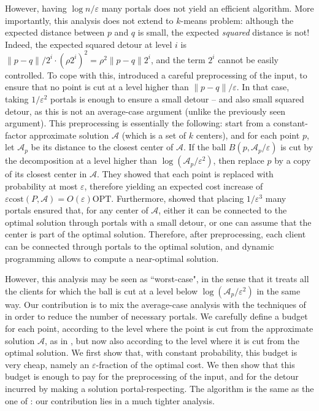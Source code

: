 \documentclass[11pt]{article}
\newcommand{\opt}{\text{OPT}}
\newcommand{\eps}{\varepsilon}
\newcommand{\cost}{\mathrm{cost}}
\newcommand{\calA}{\mathcal A}
\begin{document}
However, having $\log n / \eps$ many portals does not yield an efficient algorithm. 
More importantly, this analysis does not extend to $k$-means problem: although the expected distance between $p$ and $q$ is small, the expected \emph{squared} distance is not! Indeed, the expected squared detour at level $i$ is $\|p-q\| / 2^i \cdot (\rho 2^{i})^2 = \rho^2 \|p-q\| 2^i$, and the term $2^i$ cannot be easily controlled.
To cope with this, \cite{jacm} introduced a careful preprocessing of the input, to ensure that no point is cut at a level higher than $\|p-q\|/\eps$. In that case, taking $1/\eps^2$ portals is enough to ensure a small detour -- and also small squared detour, as this is not an average-case argument (unlike the previously seen argument). This preprocessing is essentially the following: start from a constant-factor approximate solution $\calA$ (which is a set of $k$ centers), and for each point $p$, let $\calA_p$ be its distance to the closest center of $\calA$. 
If the ball $B(p, \calA_p/\eps)$ is cut by the decomposition at a level higher than $\log(\calA_p/\eps^2)$, then replace $p$ by a copy of its closest center in $\calA$. They showed that each point is replaced with probability at most $\eps$, therefore yielding an expected cost increase of $\eps \cost(P, \calA) = O(\eps)\opt$. 
Furthermore, \cite{jacm} showed that placing $1/\eps^3$ many portals ensured that,  for any center of $\calA$, either it can be connected to the optimal solution through portals with a small detour, or one can assume that the center is part of the optimal solution. Therefore, after preprocessing, each client can be connected through portals to the optimal solution, and dynamic programming allows to compute a near-optimal solution.

However, this analysis may be seen as ``worst-case", in the sense that it treats  all the clients for which the ball is cut at a level below $\log(\calA_p/\eps^2)$ in the same way. 
Our contribution is to mix the average-case analysis with the techniques of \cite{jacm} in order to reduce the number of necessary portals. 
We carefully define a budget for each point, according to the level where the point is cut from the approximate solution $\calA$, as in \cite{jacm}, but now also according to the level where it is cut from the optimal solution. 
We first show that, with constant probability, this budget is very cheap, namely an $\eps$-fraction of the optimal cost. 
We then show that this budget is enough to pay for the preprocessing of the input, and for the detour incurred by making a solution portal-respecting.  The algorithm is the same as the one of \cite{jacm}: our contribution lies in a much tighter analysis.
\end{document}
